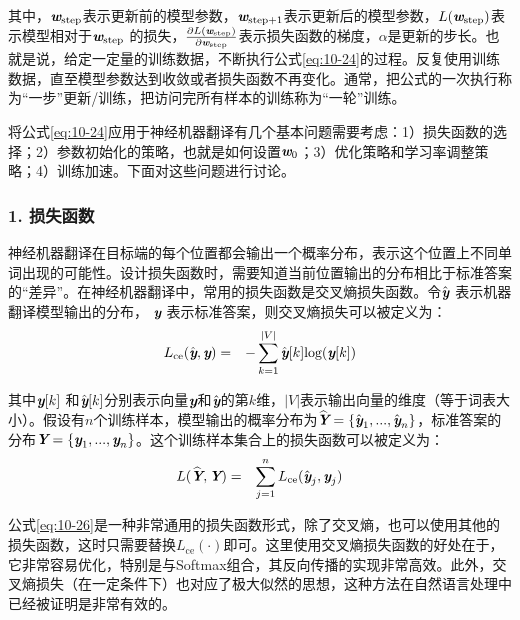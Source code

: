 \noindent 其中，$\textbf{\em w}_{\textrm{step}}$表示更新前的模型参数，$\textbf{\em w}_{\textrm{step}+1}$表示更新后的模型参数，$L(\textbf{\em w}_{\textrm{step}})$表示模型相对于$\textbf{\em w}_{\textrm{step}}$ 的损失，$\frac{\partial L(\textbf{\em w}_{\textrm{step}})} {\partial \textbf{\em w}_{\textrm{step}} }$表示损失函数的梯度，$\alpha$是更新的步长。也就是说，给定一定量的训练数据，不断执行公式\eqref{eq:10-24}的过程。反复使用训练数据，直至模型参数达到收敛或者损失函数不再变化。通常，把公式的一次执行称为“一步”更新/训练，把访问完所有样本的训练称为“一轮”训练。

\parinterval 将公式\eqref{eq:10-24}应用于神经机器翻译有几个基本问题需要考虑：1）损失函数的选择；2）参数初始化的策略，也就是如何设置$\textbf{\em w}_0$；3）优化策略和学习率调整策略；4）训练加速。下面对这些问题进行讨论。


\subsubsection{1. 损失函数}

\parinterval 神经机器翻译在目标端的每个位置都会输出一个概率分布，表示这个位置上不同单词出现的可能性。设计损失函数时，需要知道当前位置输出的分布相比于标准答案的“差异”。在神经机器翻译中，常用的损失函数是交叉熵损失函数。令$\hat{\textbf{\em y}}$ 表示机器翻译模型输出的分布， $\textbf{\em y}$ 表示标准答案，则交叉熵损失可以被定义为：
\begin{eqnarray}
L_{\textrm{ce}}(\hat{\textbf{\em y}},\textbf{\em y}) &=& - \sum_{k=1}^{|V|} \hat{\textbf{\em y}}[k] \textrm{log} (\textbf{\em y}[k])
\label{eq:10-25}
\end{eqnarray}

\noindent 其中$\textbf{\em y}[k]$ 和$\hat{\textbf{\em y}}[k]$分别表示向量$\textbf{\em y}$和$\hat{\textbf{\em y}}$的第$k$维，$|V|$表示输出向量的维度（等于词表大小）。假设有$n$个训练样本，模型输出的概率分布为$\widehat{\textbf{\em Y}}=\{ \hat{\textbf{\em y}}_1,...,\hat{\textbf{\em y}}_n \}$，标准答案的分布$\textbf{\em Y} = \{ \textbf{\em y}_1,..., \textbf{\em y}_n \}$。这个训练样本集合上的损失函数可以被定义为：
\begin{eqnarray}
L(\widehat{\textbf{\em Y}},\textbf{\em Y}) &=& \sum_{j=1}^n L_{\textrm{ce}}(\hat{\textbf{\em y}}_j,\textbf{\em y}_j)
\label{eq:10-26}
\end{eqnarray}

\parinterval 公式\eqref{eq:10-26}是一种非常通用的损失函数形式，除了交叉熵，也可以使用其他的损失函数，这时只需要替换$L_{\textrm{ce}} (\cdot)$即可。这里使用交叉熵损失函数的好处在于，它非常容易优化，特别是与Softmax组合，其反向传播的实现非常高效。此外，交叉熵损失（在一定条件下）也对应了极大似然的思想，这种方法在自然语言处理中已经被证明是非常有效的。

